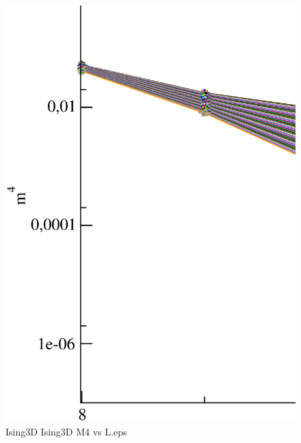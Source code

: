 \begin{figure}[!htpb]
  \centering
  \includegraphics[width=\textwidth]{./plots/Ising3D/Ising3D_M4_vs_L.eps}
  \caption{Ising3D Ising3D M4 vs L.eps}
\end{figure}

